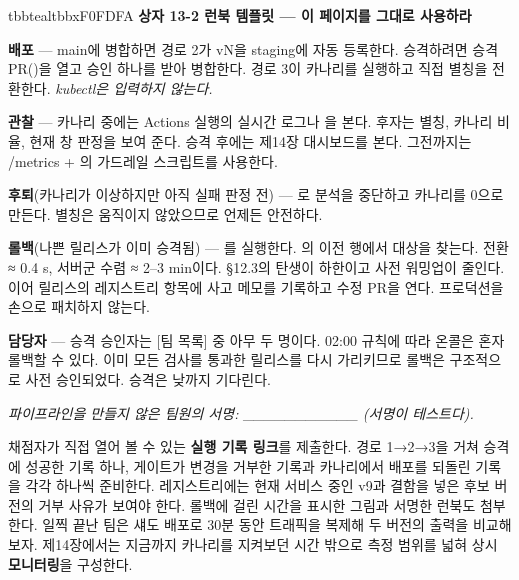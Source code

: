 \begin{calloutbox}{tbbteal}{tbbxF0FDFA}
{\normalsize\bfseries\color{tbbx115E59}상자 13-2  런북 템플릿 — 이 페이지를 그대로 사용하라}\par\vspace{3pt}
\textbf{배포} — main에 병합하면 경로 2가 vN을 staging에 자동 등록한다. 승격하려면 승격 PR()을 열고 승인 하나를 받아 병합한다. 경로 3이 카나리를 실행하고 직접 별칭을 전환한다. \textit{kubectl은 입력하지 않는다.}

\textbf{관찰} — 카나리 중에는 Actions 실행의 실시간 로그나 을 본다. 후자는 별칭, 카나리 비율, 현재 창 판정을 보여 준다. 승격 후에는 제14장 대시보드를 본다. 그전까지는 /metrics + 의 가드레일 스크립트를 사용한다.

\textbf{후퇴}(카나리가 이상하지만 아직 실패 판정 전) — 로 분석을 중단하고 카나리를 0으로 만든다. 별칭은 움직이지 않았으므로 언제든 안전하다.

\textbf{롤백}(나쁜 릴리스가 이미 승격됨) — 를 실행한다. 의 이전  행에서 대상을 찾는다. 전환 ≈ 0.4 s, 서버군 수렴 ≈ 2–3 min이다. §12.3의 탄생이 하한이고 사전 워밍업이 줄인다. 이어 릴리스의 레지스트리 항목에 사고 메모를 기록하고 수정 PR을 연다. 프로덕션을 손으로 패치하지 않는다.

\textbf{담당자} — 승격 승인자는 [팀 목록] 중 아무 두 명이다. 02:00 규칙에 따라 온콜은 혼자 롤백할 수 있다. 이미 모든 검사를 통과한 릴리스를 다시 가리키므로 롤백은 구조적으로 사전 승인되었다. 승격은 낮까지 기다린다.

\textit{파이프라인을 만들지 않은 팀원의 서명: \_\_\_\_\_\_\_\_\_\_\_ (서명이 테스트다).}
\end{calloutbox}

\vspace{3.0pt}

채점자가 직접 열어 볼 수 있는 \textbf{실행 기록 링크}를 제출한다. 경로 1→2→3을 거쳐 승격에 성공한 기록 하나, 게이트가 변경을 거부한 기록과 카나리에서 배포를 되돌린 기록을 각각 하나씩 준비한다. 레지스트리에는 현재 서비스 중인 v9과 결함을 넣은 후보 버전의 거부 사유가 보여야 한다. 롤백에 걸린 시간을 표시한 그림과 서명한 런북도 첨부한다. 일찍 끝난 팀은 섀도 배포로 30분 동안 트래픽을 복제해 두 버전의 출력을 비교해 보자. 제14장에서는 지금까지 카나리를 지켜보던 시간 밖으로 측정 범위를 넓혀 상시 \textbf{모니터링}을 구성한다.

